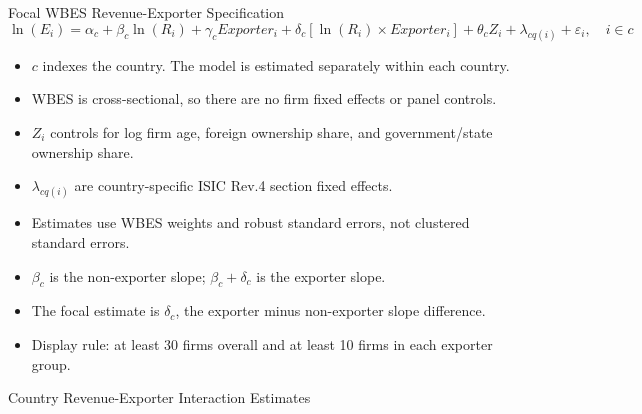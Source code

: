 \documentclass[aspectratio=169]{beamer}
\begin{document}
\begin{frame}{Focal WBES Revenue-Exporter Specification}
    \small
    \begin{equation}
        \ln(E_i) = \alpha_c + \beta_c \ln(R_i) + \gamma_c Exporter_i
        + \delta_c\left[\ln(R_i) \times Exporter_i\right]
        + \theta_c Z_i + \lambda_{c q(i)} + \varepsilon_i,
        \quad i \in c
    \end{equation}

    \begin{itemize}
        \item $c$ indexes the country. The model is estimated separately within each country.
        \item WBES is cross-sectional, so there are no firm fixed effects or panel controls.
        \item $Z_i$ controls for log firm age, foreign ownership share, and government/state ownership share.
        \item $\lambda_{c q(i)}$ are country-specific ISIC Rev.4 section fixed effects.
        \item Estimates use WBES weights and robust standard errors, not clustered standard errors.
        \item $\beta_c$ is the non-exporter slope; $\beta_c + \delta_c$ is the exporter slope.
        \item The focal estimate is $\delta_c$, the exporter minus non-exporter slope difference.
        \item Display rule: at least 30 firms overall and at least 10 firms in each exporter group.
    \end{itemize}
\end{frame}

\begin{frame}{Country Revenue-Exporter Interaction Estimates}
\end{frame}
\end{document}
